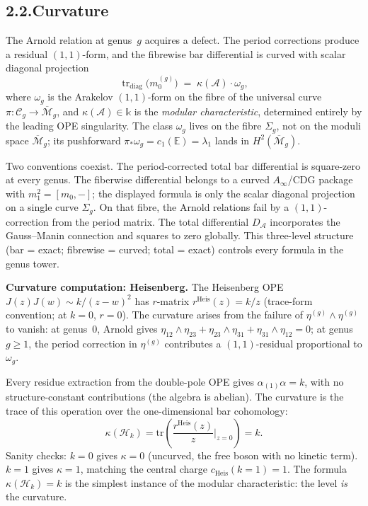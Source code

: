 \documentclass[11pt,reqno]{amsart}
\theoremstyle{definition}
\theoremstyle{remark}
\providecommand{\cA}{\mathcal{A}}
\providecommand{\cH}{\mathcal{H}}
\providecommand{\cM}{\mathcal{M}}
\providecommand{\Bbbk}{\mathbb{k}}
\numberwithin{equation}{section}
\begin{document}
\subsection*{2.2.\enspace Curvature}

The Arnold relation at genus~$g$ acquires a defect. The period
corrections produce a residual $(1,1)$-form, and the fibrewise bar
differential is curved with scalar diagonal projection
\begin{equation}\label{eq:pref-curvature}
\operatorname{tr}_{\mathrm{diag}}\!\bigl(m_0^{(g)}\bigr)
\;=\;\kappa(\cA)\cdot\omega_g,
\end{equation}
where $\omega_g$ is the Arakelov $(1,1)$-form on the fibre of the
universal curve $\pi\colon\mathcal C_g\to\overline{\mathcal M}_g$, and
$\kappa(\cA)\in\Bbbk$ is the \emph{modular characteristic}, determined
entirely by the leading OPE singularity. The class $\omega_g$ lives on
the fibre $\Sigma_g$, not on the moduli space $\overline{\cM}_g$; its
pushforward $\pi_*\omega_g=c_1(\mathbb E)=\lambda_1$ lands in
$H^2(\overline{\cM}_g)$.

Two conventions coexist. The period-corrected total bar differential is
square-zero at every genus. The fiberwise differential belongs to a
curved $A_\infty$/CDG package with $m_1^2=[m_0,-]$; the displayed
formula is only the scalar diagonal projection on a single curve
$\Sigma_g$. On that fibre, the Arnold relations fail by a
$(1,1)$-correction from the period matrix. The total
differential $D_\cA$ incorporates the Gauss--Manin connection and
squares to zero globally. This three-level structure
(bar = exact; fibrewise = curved; total = exact) controls every
formula in the genus tower.

\medskip
\noindent\textbf{Curvature computation: Heisenberg.}\enspace
The Heisenberg OPE $J(z)J(w)\sim k/(z-w)^2$ has $r$-matrix
$r^{\mathrm{Heis}}(z)=k/z$ (trace-form convention; at $k=0$, $r=0$).
The curvature arises from the failure of $\eta^{(g)}\wedge\eta^{(g)}$
to vanish: at genus~$0$, Arnold gives
$\eta_{12}\wedge\eta_{23}+\eta_{23}\wedge\eta_{31}+\eta_{31}\wedge\eta_{12}=0$;
at genus~$g\ge 1$, the period correction in $\eta^{(g)}$ contributes
a $(1,1)$-residual proportional to $\omega_g$.

Every residue extraction from the double-pole OPE gives
$\alpha_{(1)}\alpha=k$, with no structure-constant contributions (the
algebra is abelian). The curvature is the trace of this operation over
the one-dimensional bar cohomology:
\[
\kappa(\cH_k)=\mathrm{tr}\!\left(\frac{r^{\mathrm{Heis}}(z)}{z}\bigg|_{z=0}\right)=k.
\]
Sanity checks: $k=0$ gives $\kappa=0$ (uncurved, the free boson with
no kinetic term). $k=1$ gives $\kappa=1$, matching the central
charge $c_{\mathrm{Heis}}(k{=}1)=1$. The formula $\kappa(\cH_k)=k$
is the simplest instance of the modular characteristic: the level
\emph{is} the curvature.
\end{document}
